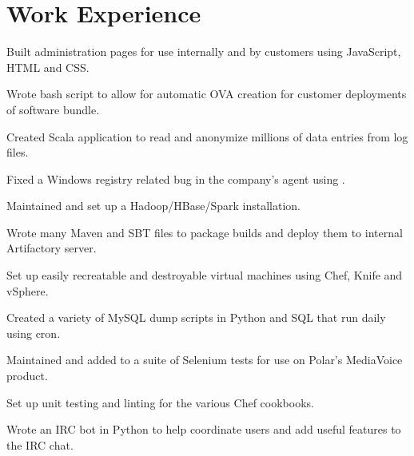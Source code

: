 \documentclass[letterpaper]{deedy-resume-modified} %
\begin{document}
\hfill
%
%
\begin{minipage}[t]{0.66\textwidth} %


\section{Work Experience}


\vspace{\topsep} %
\begin{tightitemize}
\item Built administration pages for use internally and by customers using JavaScript, HTML and CSS.
\item Wrote bash script to allow for automatic OVA creation for customer deployments of software bundle.
\item Created Scala application to read and anonymize millions of data entries from log files.
\item Fixed a Windows registry related bug in the company's agent using \CPP.
\item Maintained and set up a Hadoop/HBase/Spark installation.
\item Wrote many Maven and SBT files to package builds and deploy them to internal Artifactory server.
\end{tightitemize}

\sectionspace %



\begin{tightitemize}
\item Set up easily recreatable and destroyable virtual machines using Chef, Knife and vSphere.
\item Created a variety of MySQL dump scripts in Python and SQL that run daily using cron.
\item Maintained and added to a suite of Selenium tests for use on Polar's MediaVoice product.
\item Set up unit testing and linting for the various Chef cookbooks.
\item Wrote an IRC bot in Python to help coordinate users and add useful features to the IRC chat.
\end{tightitemize}


\end{minipage}
\end{document}
